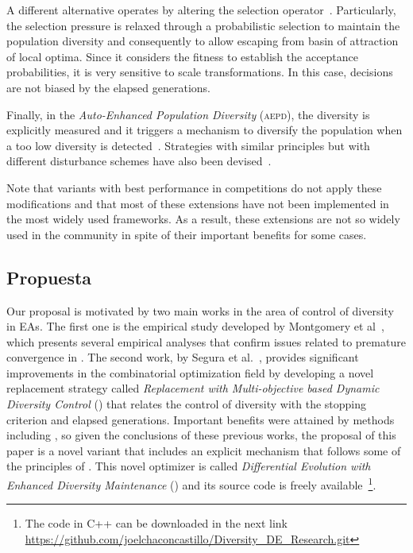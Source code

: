 A different alternative operates by altering the selection operator~\cite{sa2008exploration}.
%
Particularly, the selection pressure is relaxed through a probabilistic selection to maintain the population diversity and consequently 
to allow escaping from basin of attraction of local optima.
%
Since it considers the fitness to establish the acceptance probabilities, it is very sensitive to scale transformations.
%
In this case, decisions are not biased by the elapsed generations.

Finally, in the \textit{Auto-Enhanced Population Diversity} (\textsc{aepd}), the diversity is explicitly measured and it triggers a mechanism
to diversify the population when a too low diversity is detected~\cite{yang2015differential}.
%
Strategies with similar principles but with different disturbance schemes have also been devised~\cite{zhao2016differential}.

Note that \DE{} variants with best performance in competitions do not apply these modifications
and that most of these extensions have not been implemented in the most widely used frameworks.
%
As a result, these extensions are not so widely used in the community in spite of their important benefits
for some cases.


\subsection{Propuesta}

Our proposal is motivated by two main works in the area of control of diversity in EAs.
%
The first one is the empirical study developed by Montgomery et al~\cite{montgomery2012simple},
which presents several empirical analyses that confirm issues related to premature convergence in \DE{}.
%
The second work, by Segura et al.~\cite{segura2016novel}, provides significant improvements in the combinatorial optimization field
by developing a novel replacement strategy called \textit{Replacement with Multi-objective based Dynamic Diversity Control} (\RMDDC{}) 
that relates the control of diversity with the stopping criterion and elapsed generations.
%
Important benefits were attained by methods including \RMDDC{}, so given the conclusions of these previous works, the proposal of this paper is a 
novel \DE{} variant that includes an explicit mechanism that follows some of the principles of \RMDDC{}.
%
This novel optimizer is called \textit{Differential Evolution with Enhanced Diversity Maintenance} (\DEEDM{}) and its source
code is freely available~\footnote{The code in C++ can be downloaded in the next link \url{https://github.com/joelchaconcastillo/Diversity\_DE\_Research.git}}.

